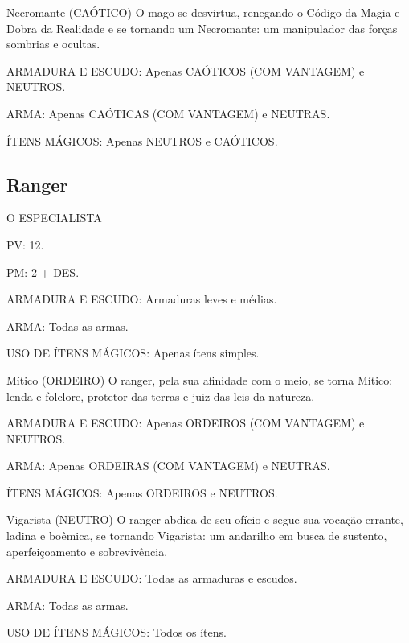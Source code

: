 \documentclass[10pt,twoside,twocolumn]{book}
\begin{document}
\begin{rpg-warnbox}{Necromante (CAÓTICO)}
O mago se desvirtua, renegando o Código da Magia e Dobra da Realidade e se tornando um Necromante: um manipulador das forças sombrias e ocultas.
    \begin{rpg-list}
      	\item ARMADURA E ESCUDO: Apenas CAÓTICOS (COM VANTAGEM) e NEUTROS.
    	\item ARMA: Apenas CAÓTICAS (COM VANTAGEM) e NEUTRAS.
    	\item ÍTENS MÁGICOS: Apenas NEUTROS e CAÓTICOS.
    \end{rpg-list}
\end{rpg-warnbox} 

\subsection{Ranger}

\begin{rpg-quotebox}{O ESPECIALISTA}
      \begin{rpg-list}
       \item PV: 12.
       \item PM: 2 + DES.
       \item ARMADURA E ESCUDO: Armaduras leves e médias.
       \item ARMA: Todas as armas.
       \item USO DE ÍTENS MÁGICOS: Apenas ítens simples.
  \end{rpg-list}
\end{rpg-quotebox}

\begin{rpg-suggestionbox}{Mítico (ORDEIRO)}
O ranger, pela sua afinidade com o meio, se torna Mítico: lenda e folclore, protetor das terras e juiz das leis da natureza.
  \begin{rpg-list}
       \item ARMADURA E ESCUDO: Apenas ORDEIROS (COM VANTAGEM) e NEUTROS.
       \item ARMA: Apenas ORDEIRAS (COM VANTAGEM) e NEUTRAS.
       \item ÍTENS MÁGICOS: Apenas ORDEIROS e NEUTROS.
  \end{rpg-list}    
\end{rpg-suggestionbox}

\begin{rpg-commentbox}{Vigarista (NEUTRO)}
	O ranger abdica de seu ofício e segue sua vocação errante, ladina e boêmica, se tornando Vigarista: um andarilho em busca de sustento, aperfeiçoamento e sobrevivência.
    \begin{rpg-list}
      	\item ARMADURA E ESCUDO: Todas as armaduras e escudos.
    	\item ARMA: Todas as armas.
    	\item USO DE ÍTENS MÁGICOS: Todos os ítens.
    \end{rpg-list}
\end{rpg-commentbox}
\end{document}
